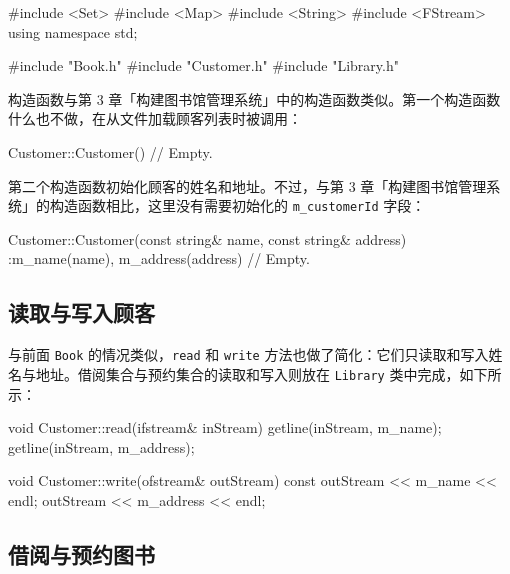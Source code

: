 \begin{codebox}
    set<Book*> m_loanPtrSet, m_reservationPtrSet;
};
\end{codebox}

\medskip{}

\begin{codebox}
#include <Set>
#include <Map>
#include <String>
#include <FStream>
using namespace std;

#include "Book.h"
#include "Customer.h"
#include "Library.h"
\end{codebox}

构造函数与第 3 章「构建图书馆管理系统」中的构造函数类似。第一个构造函数什么也不做，在从文件加载顾客列表时被调用：

\begin{codebox}
Customer::Customer() {
  // Empty.
}
\end{codebox}

第二个构造函数初始化顾客的姓名和地址。不过，与第 3 章「构建图书馆管理系统」的构造函数相比，这里没有需要初始化的 \texttt{m\_customerId} 字段：

\begin{codebox}
Customer::Customer(const string& name, const string& address)
  :m_name(name),
   m_address(address) {
  // Empty.
}
\end{codebox}

\subsection{读取与写入顾客}

与前面 \texttt{Book} 的情况类似，\texttt{read} 和 \texttt{write} 方法也做了简化：它们只读取和写入姓名与地址。借阅集合与预约集合的读取和写入则放在 \texttt{Library} 类中完成，如下所示：

\begin{codebox}
void Customer::read(ifstream& inStream) {
  getline(inStream, m_name);
  getline(inStream, m_address);
}
\end{codebox}

\begin{codebox}
void Customer::write(ofstream& outStream) const {
  outStream << m_name << endl;
  outStream << m_address << endl;
}
\end{codebox}

\subsection{借阅与预约图书}

